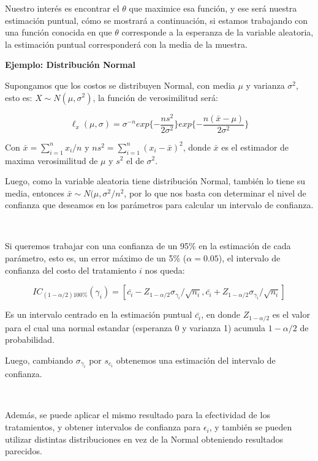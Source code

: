 \documentclass{article}
\begin{document}
Nuestro interés es encontrar el $\theta$ que maximice esa función, y ese será nuestra estimación puntual, cómo se mostrará a continuación, si estamos trabajando con una función conocida en que $\theta$ corresponde a la esperanza de la variable aleatoria, la estimación puntual corresponderá con la media de la muestra.

\textbf{Ejemplo: Distribución Normal}

Supongamos que los costos se distribuyen Normal, con media $\mu$ y varianza $\sigma^2$, esto es: $X \sim N(\mu,\sigma^2)$, la función de verosimilitud será:

\begin{equation}
    \ell_x(\mu,\sigma)= \sigma^{-n}exp\{-\frac{ns^2}{2\sigma^2}\}exp\{-\frac{n(\bar{x}-\mu)}{2\sigma^2}\}
\end{equation}

Con $\bar{x} = \sum_{i=1}^n x_i/n$ y $ns^2=\sum_{i=1}^n (x_i-\bar{x})^2$, donde $\bar{x}$ es el estimador de maxima verosimilitud de $\mu$ y $s^2$ el de $\sigma^2$.
\

Luego, como la variable aleatoria tiene distribución Normal, también lo tiene su media, entonces $\bar{x} \sim N(\mu,\sigma^2/n^2$, por lo que nos basta con determinar el nivel de confianza que deseamos en los parámetros para calcular un intervalo de confianza.

\

Si queremos trabajar con una confianza de un 95\% en la estimación de cada parámetro, esto es, un error máximo de un 5\% ($\alpha=0.05$), el intervalo de confianza del costo del tratamiento $i$ nos queda:

\begin{equation}
    IC_{(1-\alpha/2)100\%}(\gamma_i) = [\bar{c_i} - Z_{1-\alpha/2}\sigma_{\gamma_i}/\sqrt{n_i} , \bar{c_i} + Z_{1-\alpha/2}\sigma_{\gamma_i}/\sqrt{n_i}  ]
\end{equation}

Es un intervalo centrado en la estimación puntual $\bar{c_i}$, en donde $Z_{1-\alpha/2}$ es el valor para el cual una normal estandar (esperanza 0 y varianza 1) acumula $1-\alpha/2$ de probabilidad.

Luego, cambiando $\sigma_{\gamma_i}$ por $s_{c_i}$ obtenemos una estimación del intervalo de confianza.

\

Además, se puede aplicar el mismo resultado para la efectividad de los tratamientos, y obtener intervalos de confianza para $\epsilon_i$, y también se pueden utilizar distintas distribuciones en vez de la Normal obteniendo resultados parecidos.
\end{document}
